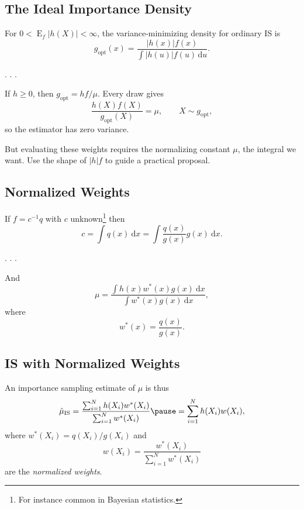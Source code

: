 \documentclass[
  letterpaper,
  DIV=11,
  numbers=noendperiod]{scrartcl}
\begin{document}
\subsection{The Ideal Importance
Density}\label{the-ideal-importance-density}

For \(0 < \operatorname{E}_f|h(X)| < \infty\), the variance-minimizing
density for ordinary IS is \[
  g_{\mathrm{opt}}(x) = \frac{|h(x)|f(x)}{\int |h(u)|f(u)\,\mathrm{d}u}.
\]

. . .

If \(h \geq 0\), then \(g_{\mathrm{opt}} = hf / \mu\). Every draw gives
\[
  \frac{h(X)f(X)}{g_{\mathrm{opt}}(X)} = \mu, \qquad X \sim g_{\mathrm{opt}},
\] so the estimator has \alert{zero variance}.

\medskip\pause

But evaluating these weights requires the normalizing constant \(\mu\),
the integral we want. Use the shape of \(|h|f\) to guide a practical
proposal.


\subsection{Normalized Weights}\label{normalized-weights}

If \(f = c^{-1} q\) with \(c\) unknown\footnote{For instance common in
  Bayesian statistics.} then \[
  c = \int q(x) \ \mathrm{d}x = \int \frac{q(x)}{g(x)} g(x) \ \mathrm{d}x.
\]

. . .

And \[
  \mu
  = \frac{\int h(x) w^*(x) g(x) \ \mathrm{d}x}{\int w^*(x) g(x) \ \mathrm{d}x},
\] where \[
  w^*(x) = \frac{q(x)}{g(x)}.
\]


\subsection{IS with Normalized
Weights}\label{is-with-normalized-weights}

An importance sampling estimate of \(\mu\) is thus \[
  \hat{\mu}_{\mathrm{IS}}
  = \frac{\sum_{i=1}^N h(X_i) w^*(X_i)}{\sum_{i=1}^N w^*(X_i)} \pause
  = \sum_{i=1}^N h(X_i) w(X_i),
\] where \(w^*(X_i) = q(X_i) / g(X_i)\) and \[
  w(X_i) = \frac{w^*(X_i)}{\sum_{i=1}^N w^*(X_i)}
\] are the \emph{normalized weights}.
\end{document}
